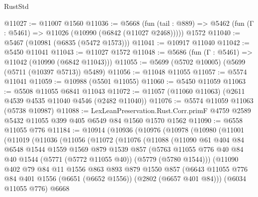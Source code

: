 \begin{lexlean}{RustStd}
\begin{coremodule}
@11027 := @11007 @1560
@11036 := @5668
    (fun (tail : @889) => @5462 (fun (Γ : @5461) => @11026 (@10990 (@6842 (@11027 @2468)))))
    @1572
@11040 := @5467 (@10981 (@6835 (@5472 @1573)))
@11041 := @10917 @11040
@11042 := @5450 @11041
@11043 := @11027 @1572
@11048 := @5686 (fun (Γ : @5461) => @11042 (@10990 (@6842 @11043)))
@11055 := @5699 (@5702 @10005) (@5699 (@5711 (@10397 @5713)) @5489)
@11056 := @11048 @11055
@11057 := @5574 @11041
@11059 := @10988 (@5501 @11055)
@11060 := @5450 @11059
@11063 := @5508 @11055 @6841 @11043
@11072 := @11057 (@11060 @11063) (@2611 @4539 @4535 @11040 @4546 (@2482 @11040))
@11076 := @5574 @11059 @11063 (@5738 @10987)
@11088 := LexLeanPreservation.Rust.Corr.primF
    @4759
    @2589
    @5432
    @11055
    @399
    @405
    @6549
    @84
    @1560
    @1570
    @1562
@11090 := @6558 @11055 @776
@11184 := @10914
    (@10936
      (@10976
        (@10978
          (@10980
            (@11001
              (@11019
                (@11036
                  (@11056
                    (@11072
                      (@11076
                        (@11088
                          (@11090
                            @61
                            @404
                            @84
                            @6548
                            @1544
                            @1559
                            @1569
                            @879
                            @1539
                            @857
                            (@5763
                              @11055
                              @776
                              @40
                              @84
                              @40
                              @1544
                              (@5771 (@5772 @11055 @40))
                              (@5779 (@5780 @1544)))
                            (@11090
                              @402
                              @79
                              @84
                              @11
                              @1556
                              @863
                              @893
                              @879
                              @1550
                              @857
                              (@6643
                                @11055
                                @776
                                @84
                                @401
                                @1556
                                (@6651 (@6652 @1556))
                                (@2802 (@6657 @401 @84)))
                              (@6034 @11055 @776)
                              @6668

\end{coremodule}
\end{lexlean}
